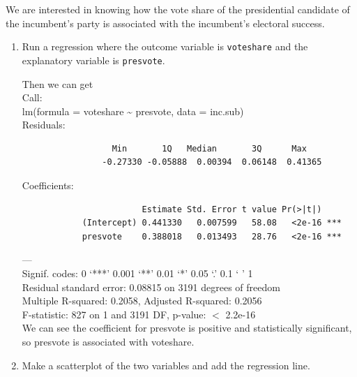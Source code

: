\documentclass[12pt,letterpaper]{article}
\begin{document}
\noindent We are interested in knowing how the vote share of the presidential candidate of the incumbent's party is associated with the incumbent's electoral success.
	\vspace{.25cm}
	\begin{enumerate}
		\item Run a regression where the outcome variable is \texttt{voteshare} and the explanatory variable is \texttt{presvote}.
			 
			
				Then we can get\\
			
			Call:\\
			lm(formula = voteshare \~{} presvote, data = inc.sub)\\
			
				Residuals:\\
			\begin{verbatim}
				  Min       1Q   Median       3Q      Max 
				-0.27330 -0.05888  0.00394  0.06148  0.41365
			\end{verbatim}
			Coefficients:\\
			\begin{verbatim}
		            	Estimate Std. Error t value Pr(>|t|)    
			(Intercept) 0.441330   0.007599   58.08   <2e-16 ***
			presvote    0.388018   0.013493   28.76   <2e-16 ***
			\end{verbatim}
			---\\
			Signif. codes:  0 ‘***’ 0.001 ‘**’ 0.01 ‘*’ 0.05 ‘.’ 0.1 ‘ ’ 1\\
			
			Residual standard error: 0.08815 on 3191 degrees of freedom\\
			Multiple R-squared:  0.2058,	Adjusted R-squared:  0.2056 \\
			F-statistic:   827 on 1 and 3191 DF,  p-value: $<$ 2.2e-16\\
			
			We can see the coefficient for presvote is positive and statistically significant, so presvote is associated with voteshare.
				
			\vspace{5cm}
			
		\item Make a scatterplot of the two variables and add the regression line. 
			 
			\begin{figure}[H]\centering
			

\end{figure}
\end{enumerate}
\end{document}

